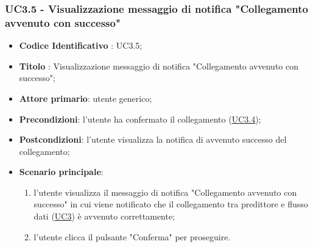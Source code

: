 	\subsubsection{UC3.5 - Visualizzazione messaggio di notifica "Collegamento avvenuto con successo"}
		\begin{itemize}
			\item\textbf{Codice Identificativo} : UC3.5;
			\item\textbf{Titolo} : Visualizzazione messaggio di notifica "Collegamento avvenuto con successo";
			\item\textbf{Attore primario}: utente generico;
			\item\textbf{Precondizioni}: l'utente ha confermato il collegamento (\hyperref[par:UC3.4]{UC3.4});
			\item\textbf{Postcondizioni}: l'utente visualizza la notifica di avvenuto successo del collegamento;
			\item\textbf{Scenario principale}:
				\begin{enumerate}
					\item l'utente visualizza il messaggio di notifica "Collegamento avvenuto con successo" in cui viene notificato che il collegamento tra predittore e flusso dati (\hyperref[par:UC3]{UC3}) è avvenuto correttamente;
					\item l'utente clicca il pulsante "Conferma" per proseguire.		
				\end{enumerate}		
		\end{itemize}

	\label{par:UC3.6}
